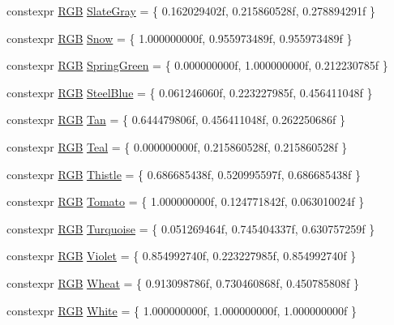 \begin{DoxyCompactItemize}
\item 
constexpr \hyperlink{structmage_1_1_r_g_b}{R\+GB} \hyperlink{namespacemage_1_1color_a1553763ab8b4309ffb51fc4f48ed2a12}{Slate\+Gray} = \{ 0.\+162029402f, 0.\+215860528f, 0.\+278894291f \}
\item 
constexpr \hyperlink{structmage_1_1_r_g_b}{R\+GB} \hyperlink{namespacemage_1_1color_aab49681d71304f41e6c9606093ab5b95}{Snow} = \{ 1.\+000000000f, 0.\+955973489f, 0.\+955973489f \}
\item 
constexpr \hyperlink{structmage_1_1_r_g_b}{R\+GB} \hyperlink{namespacemage_1_1color_acb2eb0c5c4be0356ad6614ff63c36738}{Spring\+Green} = \{ 0.\+000000000f, 1.\+000000000f, 0.\+212230785f \}
\item 
constexpr \hyperlink{structmage_1_1_r_g_b}{R\+GB} \hyperlink{namespacemage_1_1color_a2a4b03e450e79d03ce4e6061d54ad671}{Steel\+Blue} = \{ 0.\+061246060f, 0.\+223227985f, 0.\+456411048f \}
\item 
constexpr \hyperlink{structmage_1_1_r_g_b}{R\+GB} \hyperlink{namespacemage_1_1color_a1a70b829eefc1b4686d328747e4c712d}{Tan} = \{ 0.\+644479806f, 0.\+456411048f, 0.\+262250686f \}
\item 
constexpr \hyperlink{structmage_1_1_r_g_b}{R\+GB} \hyperlink{namespacemage_1_1color_a80f897dd60d4faed02aeb55da726e013}{Teal} = \{ 0.\+000000000f, 0.\+215860528f, 0.\+215860528f \}
\item 
constexpr \hyperlink{structmage_1_1_r_g_b}{R\+GB} \hyperlink{namespacemage_1_1color_a83d1f3bdc2f2cd9008bd7b3595a7ebe2}{Thistle} = \{ 0.\+686685438f, 0.\+520995597f, 0.\+686685438f \}
\item 
constexpr \hyperlink{structmage_1_1_r_g_b}{R\+GB} \hyperlink{namespacemage_1_1color_a9b06c8cba67af690ad468fc816c33932}{Tomato} = \{ 1.\+000000000f, 0.\+124771842f, 0.\+063010024f \}
\item 
constexpr \hyperlink{structmage_1_1_r_g_b}{R\+GB} \hyperlink{namespacemage_1_1color_aec5f952221972849e7c9033eb2dc8dcf}{Turquoise} = \{ 0.\+051269464f, 0.\+745404337f, 0.\+630757259f \}
\item 
constexpr \hyperlink{structmage_1_1_r_g_b}{R\+GB} \hyperlink{namespacemage_1_1color_a2e9d37cb1ef054fad5b999c98e4bb80c}{Violet} = \{ 0.\+854992740f, 0.\+223227985f, 0.\+854992740f \}
\item 
constexpr \hyperlink{structmage_1_1_r_g_b}{R\+GB} \hyperlink{namespacemage_1_1color_a7e58d877ef2ef3fdfe2520b1e8090cdf}{Wheat} = \{ 0.\+913098786f, 0.\+730460868f, 0.\+450785808f \}
\item 
constexpr \hyperlink{structmage_1_1_r_g_b}{R\+GB} \hyperlink{namespacemage_1_1color_a39aae61faf172a41b44e2d308e1e4da6}{White} = \{ 1.\+000000000f, 1.\+000000000f, 1.\+000000000f \}

\end{DoxyCompactItemize}

